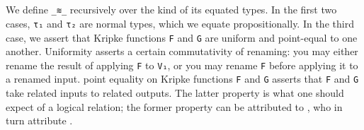 \documentclass[authoryear, acmsmall, screen, review, nonacm]{acmart}
\begin{document}
\begin{code}%
\>[0]\AgdaSpace{}%
\AgdaSymbol{:}\AgdaSpace{}%
\AgdaSpace{}%
\AgdaSpace{}%
\AgdaSpace{}%
\AgdaSpace{}%
\AgdaSpace{}%
\AgdaSpace{}%
\AgdaSpace{}%
\AgdaSpace{}%
\<%
\\
\>[0]\AgdaSpace{}%
\AgdaSymbol{:}\AgdaSpace{}%
\AgdaSpace{}%
\AgdaSymbol{\{}\AgdaSymbol{\}}\AgdaSpace{}%
\AgdaSymbol{\{}\AgdaSymbol{\}}\AgdaSpace{}%
\AgdaSymbol{\{}\AgdaSymbol{\}}\AgdaSpace{}%
\AgdaSymbol{(}\AgdaSpace{}%
\AgdaSpace{}%
\AgdaSymbol{:}\AgdaSpace{}%
\AgdaSpace{}%
\AgdaSpace{}%
\AgdaSpace{}%
\AgdaSymbol{)}\AgdaSpace{}%
\AgdaSpace{}%
\<%
\\
\>[0]\AgdaSpace{}%
\AgdaSymbol{:}%
\>[11]\AgdaSpace{}%
\AgdaSymbol{\{}\AgdaSymbol{\}}\AgdaSpace{}%
\AgdaSymbol{\{}\AgdaSymbol{\}}\AgdaSpace{}%
\AgdaSymbol{\{}\AgdaSymbol{\}}\AgdaSpace{}%
\AgdaSpace{}%
\AgdaSpace{}%
\AgdaSpace{}%
\AgdaSpace{}%
\AgdaSpace{}%
\AgdaSpace{}%
\<%
\end{code}


\Ni We define \verb!_≋_! recursively over the kind of its equated types. In the first two cases, \verb!τ₁! and \verb!τ₂! are normal types, which we equate propositionally. In the third case, we assert that Kripke functions \verb!F! and \verb!G! are uniform and point-equal to one another. Uniformity asserts a certain commutativity of renaming: you may either rename the result of applying \verb!F! to \verb!V₁!, or you may rename \verb!F! before applying it to a renamed input. point equality on Kripke functions \verb!F! and \verb!G! asserts that \verb!F! and \verb!G! take related inputs to related outputs. The latter property is what one should expect of a logical relation; the former property can be attributed to \citet{ChapmanKNW19}, who in turn attribute \citet{AllaisBM13}. 
\end{document}
